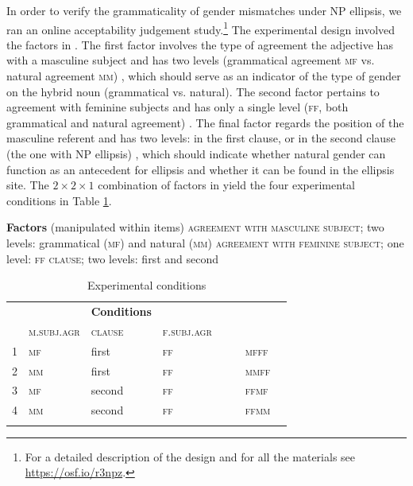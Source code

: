 \documentclass[output=paper,
modfonts,
newtxmath,
hidelinks
]{langscibook}
\begin{document}
In order to verify the grammaticality of gender mismatches under NP ellipsis, we ran an online acceptability judgement study.\footnote{For a detailed description of the design and for all the materials see \url{https://osf.io/r3npz}.} 
The experimental design involved the factors  in . The first factor involves the type of agreement the adjective has with a masculine subject and has two levels (grammatical agreement \textsc{mf} vs. natural agreement \textsc{mm}) , which should serve as an indicator of the type of gender on the hybrid noun (grammatical vs. natural).
The second factor pertains to agreement with feminine subjects and has only a single level (\textsc{ff}, both grammatical and natural agreement) . The final factor regards the position of the masculine referent and has two levels:
in the first clause, or in  the second clause (the one with NP ellipsis) , which should indicate whether natural gender can function as an antecedent for ellipsis and whether it can be found in the ellipsis site. The $2\times 2\times 1$ combination of factors in  yield the four experimental conditions in Table \ref{14:table:experimconditions}.

 \ea \textbf{Factors} (manipulated within items)\label{14:ex9}
  			\ea \textsc{agreement with masculine subject}; two levels: grammatical (\textsc{mf}) and natural (\textsc{mm})\label{14:ex9a}
  			\ex \textsc{agreement with feminine subject}; one level: \textsc{ff} \label{14:ex9b}
  			\ex \textsc{clause}; two levels: first and second\label{14:ex9c}
            \z \z
 
\begin{table}[h]
  		\centering
  		\begin{tabularx}{0.8\textwidth}{llp{2cm}llll}
		\lsptoprule
  			\multicolumn{4}{c}{\textbf{Factors and levels}} & & \textbf{Conditions}\\
  			& \textsc{m.subj.agr}         & \textsc{clause} & \textsc{f.subj.agr}  &               & \\
			\midrule
  			1  & \textsc{mf}     & first  & \textsc{ff}          & ~~  & \textsc{mfff} \\
  			2  & \textsc{mm}     & first  & \textsc{ff}          &     & \textsc{mmff} \\	
  			3  & \textsc{mf}     & second & \textsc{ff}          &   & \textsc{ffmf} \\
  			4  & \textsc{mm}     & second & \textsc{ff}          &    &  \textsc{ffmm} \\\lspbottomrule
  		\end{tabularx}
  		\caption{\label{14:table:experimconditions}Experimental conditions}
  	\end{table}	
\end{document}

